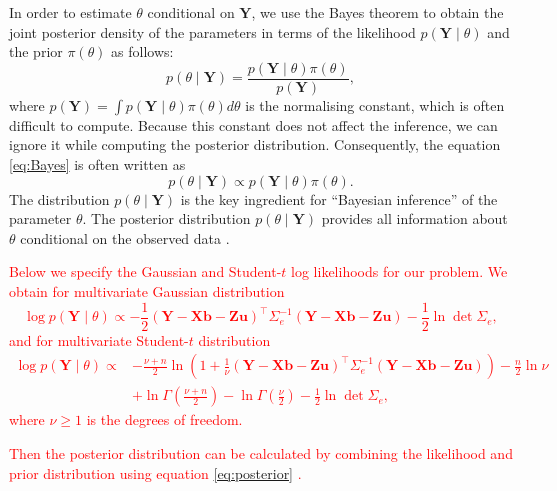 \documentclass[a4paper]{article}   	%
\begin{document}
		In order to estimate $\theta$ conditional on $\bm{Y}$, we use the Bayes theorem to obtain the joint posterior density of the parameters in terms of the likelihood $p(\bm{Y}\mid\theta)$ and the prior $\pi(\theta)$ as follows:
	\begin{equation}\label{eq:Bayes}
		p(\theta\mid \bm{Y}) = \frac{p(\bm{Y}\mid\theta)\pi(\theta)}{p(\bm{Y})},
	\end{equation}
	where $p(\bm{Y}) = \int p(\bm{Y}\mid\theta)\pi(\theta) d\theta$ is the normalising constant, which is often difficult to compute. Because this constant does not affect the inference, we can ignore it while computing the posterior distribution. Consequently, the equation \eqref{eq:Bayes} is often written as 
	\begin{equation}\label{eq:posterior}
		p(\theta\mid \bm{Y}) \propto p(\bm{Y}\mid\theta)\pi(\theta).
	\end{equation}
The distribution $p(\theta\mid \bm{Y})$ is the key ingredient for ``Bayesian inference'' of the parameter $\theta$. The posterior distribution $p(\theta\mid \bm{Y})$ provides all information about $\theta$ conditional on the observed data \parencite{Che2010Bayesian}. 
	
    \textcolor{red}{Below we specify the Gaussian and Student-$t$ log likelihoods for our problem. We obtain for multivariate Gaussian distribution 
	\begin{equation}\label{eq:logGpost}
		\log p(\bm{Y}\mid\theta) \propto -\frac{1}{2} (\bm{Y}-\bm{X}\bm{b}-\bm{Z}\bm{u})^\top \Sigma_e^{-1}(\bm{Y}-\bm{X}\bm{b}-\bm{Z}\bm{u}) -\frac{1}{2}\ln\det\Sigma_e,
	\end{equation}
and for multivariate Student-$t$ distribution
	\begin{equation}\label{eq:logTpost}
		\begin{split}
			\log p(\bm{Y}\mid\theta) \propto &-\frac{\nu+n}{2}\ln \left( 
			1+\frac{1}{\nu}(\bm{Y}-\bm{X}\bm{b}-\bm{Z}\bm{u})^\top\Sigma_e^{-1}(\bm{Y}-\bm{X}\bm{b}-\bm{Z}\bm{u})  \right) -\frac{n}{2}\ln\nu \\ &+ \ln \Gamma(\frac{\nu+n}{2}) - \ln\Gamma(\frac{\nu}{2})-\frac{1}{2}\ln\det \Sigma_e,
		\end{split}
	\end{equation}
	where $\nu\geq 1$ is the degrees of freedom. }
	
	\textcolor{red}{Then the posterior distribution can be calculated by combining the likelihood and prior distribution using equation \eqref{eq:posterior} \parencite{Besag1999Bayesian,Tsionas2002Bayesian}. }
	
\end{document}

